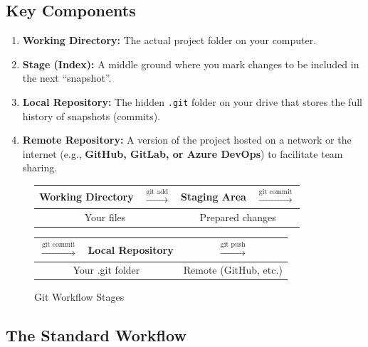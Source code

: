 \documentclass[11pt,a4paper]{article}
\begin{document}
\subsection{Key Components}

\begin{enumerate}[leftmargin=*]
    \item \textbf{Working Directory:} The actual project folder on your computer.
    
    \item \textbf{Stage (Index):} A middle ground where you mark changes to be included in the next ``snapshot''.
    
    \item \textbf{Local Repository:} The hidden \texttt{.git} folder on your drive that stores the full history of snapshots (commits).
    
    \item \textbf{Remote Repository:} A version of the project hosted on a network or the internet (e.g., \textbf{GitHub, GitLab, or Azure DevOps}) to facilitate team sharing.
\end{enumerate}

\begin{figure}[h]
\centering
\begin{tabular}{|c|c|c|c|}
\hline
\textbf{Working Directory} & $\xrightarrow{\text{git add}}$ & \textbf{Staging Area} & $\xrightarrow{\text{git commit}}$ \\
\hline
\multicolumn{2}{|c|}{Your files} & \multicolumn{2}{c|}{Prepared changes} \\
\hline
\end{tabular}

\vspace{0.5cm}

\begin{tabular}{|c|c|c|}
\hline
$\xrightarrow{\text{git commit}}$ & \textbf{Local Repository} & $\xrightarrow{\text{git push}}$ \\
\hline
\multicolumn{2}{|c|}{Your .git folder} & Remote (GitHub, etc.) \\
\hline
\end{tabular}
\caption{Git Workflow Stages}
\end{figure}

\subsection{The Standard Workflow}
\end{document}

